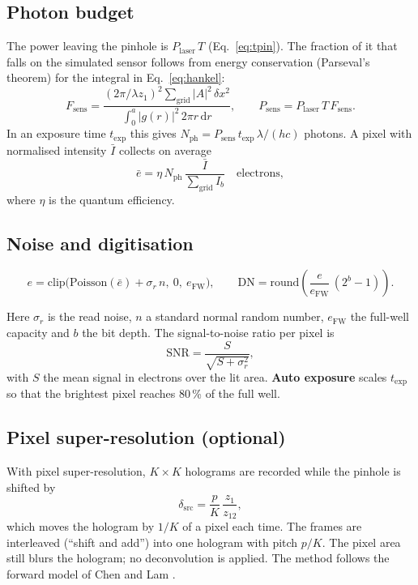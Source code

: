 \documentclass[12pt,a4paper]{article}
\newcommand{\dd}{\,\mathrm{d}}
\begin{document}
\subsection{Photon budget}
The power leaving the pinhole is $P_\mathrm{laser}\,T$ (Eq.~\ref{eq:tpin}). The fraction of it that falls on the simulated sensor follows from energy conservation (Parseval's theorem) for the integral in Eq.~\eqref{eq:hankel}:
\begin{equation}
F_\mathrm{sens}=\frac{(2\pi/\lambda z_1)^2\sum_\mathrm{grid}|A|^2\,\delta x^2}{\int_0^a|g(r)|^2\,2\pi r\dd r},
\qquad
P_\mathrm{sens}=P_\mathrm{laser}\,T\,F_\mathrm{sens}.
\end{equation}
In an exposure time $t_\mathrm{exp}$ this gives $N_\mathrm{ph}=P_\mathrm{sens}\,t_\mathrm{exp}\,\lambda/(hc)$ photons. A pixel with normalised intensity $\bar I$ collects on average
\begin{equation}
\bar e=\eta\,N_\mathrm{ph}\,\frac{\bar I}{\sum_\mathrm{grid}I_b}\quad\text{electrons},
\end{equation}
where $\eta$ is the quantum efficiency.

\subsection{Noise and digitisation}
\begin{keyeq}
\begin{equation}
e=\mathrm{clip}\Big(\mathrm{Poisson}(\bar e)+\sigma_r\,n,\ 0,\ e_\mathrm{FW}\Big),\qquad
\mathrm{DN}=\mathrm{round}\!\left(\frac{e}{e_\mathrm{FW}}\,(2^b-1)\right).
\end{equation}
\end{keyeq}
Here $\sigma_r$ is the read noise, $n$ a standard normal random number, $e_\mathrm{FW}$ the full-well capacity and $b$ the bit depth. The signal-to-noise ratio per pixel is
\begin{equation}
\mathrm{SNR}=\frac{S}{\sqrt{S+\sigma_r^2}},
\end{equation}
with $S$ the mean signal in electrons over the lit area. \textbf{Auto exposure} scales $t_\mathrm{exp}$ so that the brightest pixel reaches 80\,\% of the full well.

\subsection{Pixel super-resolution (optional)}
With pixel super-resolution, $K\times K$ holograms are recorded while the pinhole is shifted by
\begin{equation}
\delta_\mathrm{src}=\frac{p}{K}\,\frac{z_1}{z_{12}},
\end{equation}
which moves the hologram by $1/K$ of a pixel each time. The frames are interleaved (``shift and add'') into one hologram with pitch $p/K$. The pixel area still blurs the hologram; no deconvolution is applied. The method follows the forward model of Chen and Lam \cite{ChenLam}.
\end{document}

